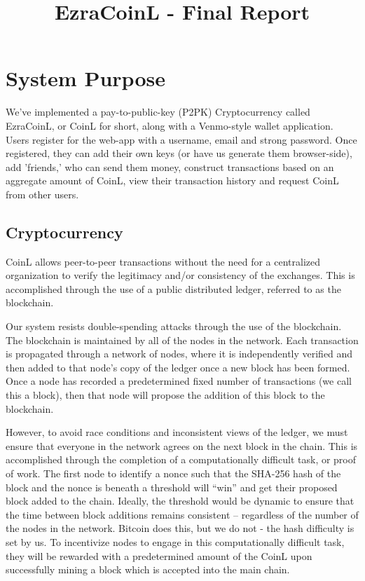 \documentclass[12pt]{article}
\title{EzraCoinL - Final Report}
\author{
\iam{James Cassell}{jcc384}
\and
\iam{Evan King}{esk79}
\and
\iam{Ethan Koenig}{etk39}
\and
\iam{Eric Perdew}{ecp84}
\and
\iam{Will Ronchetti}{wrr33}
}
\begin{document}
\maketitle

\section{System Purpose}

We've  implemented a pay-to-public-key (P2PK) Cryptocurrency called EzraCoinL, or CoinL for short, along with a Venmo-style wallet application. Users register for the web-app with a username, email and strong password. Once registered, they can add their own keys (or have us generate them browser-side), add 'friends,' who can send them money, construct transactions based on an aggregate amount of CoinL, view their transaction history and request CoinL from other users.

\subsection*{Cryptocurrency}

CoinL allows peer-to-peer transactions without the need for a centralized organization to verify the legitimacy and/or consistency of the exchanges.  This is accomplished through the use of a public distributed ledger, referred to as the blockchain.

Our system resists double-spending attacks through the use of the blockchain. The blockchain is maintained by all of the nodes in the network. Each transaction is propagated through a network of nodes, where it is  independently verified and then added to that node's copy of the ledger once a new block has been formed. Once a node has recorded a predetermined fixed number of transactions (we call this a block), then that node will propose the addition of this block to the blockchain.

However, to avoid race conditions and inconsistent views of the ledger, we must ensure that everyone in the network agrees on the next block in the chain. This is accomplished through the completion of a computationally difficult task, or proof of work. The first node to identify a nonce such that the SHA-256 hash of the block and the nonce is beneath a threshold will ``win'' and get their proposed block added to the chain. Ideally, the threshold would be dynamic to ensure that the time between block additions remains consistent -- regardless of the number of the nodes in the network. Bitcoin does this, but we do not - the hash difficulty is set by us.  To incentivize nodes to engage in this computationally difficult task, they will be rewarded with a predetermined amount of the CoinL upon successfully mining a block which is accepted into the main chain.
\end{document}
